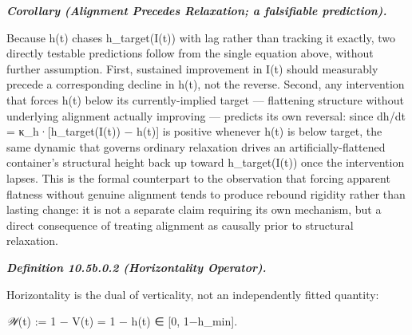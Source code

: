 \documentclass[
]{article}
\begin{document}
\emph{\textbf{Corollary (Alignment Precedes Relaxation; a falsifiable
prediction).}}

Because h(t) chases h\_target(I(t)) with lag rather than tracking it
exactly, two directly testable predictions follow from the single
equation above, without further assumption. First, sustained improvement
in I(t) should measurably precede a corresponding decline in h(t), not
the reverse. Second, any intervention that forces h(t) below its
currently-implied target --- flattening structure without underlying
alignment actually improving --- predicts its own reversal: since dh/dt
= κ\_h·{[}h\_target(I(t)) − h(t){]} is positive whenever h(t) is below
target, the same dynamic that governs ordinary relaxation drives an
artificially-flattened container's structural height back up toward
h\_target(I(t)) once the intervention lapses. This is the formal
counterpart to the observation that forcing apparent flatness without
genuine alignment tends to produce rebound rigidity rather than lasting
change: it is not a separate claim requiring its own mechanism, but a
direct consequence of treating alignment as causally prior to structural
relaxation.

\emph{\textbf{Definition 10.5b.0.2 (Horizontality Operator).}}

Horizontality is the dual of verticality, not an independently fitted
quantity:

\emph{𝒲}(t) := 1 − V(t) = 1 − h(t) ∈ {[}0, 1−h\_min{]}.
\end{document}

